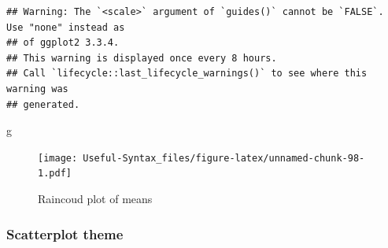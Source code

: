 \documentclass[
]{article}
\newenvironment{Shaded}{\begin{snugshade}}{\end{snugshade}}
\newcommand{\NormalTok}[1]{#1}
\begin{document}
\begin{verbatim}
## Warning: The `<scale>` argument of `guides()` cannot be `FALSE`. Use "none" instead as
## of ggplot2 3.3.4.
## This warning is displayed once every 8 hours.
## Call `lifecycle::last_lifecycle_warnings()` to see where this warning was
## generated.
\end{verbatim}

\begin{Shaded}
\begin{Highlighting}[]
\NormalTok{g}
\end{Highlighting}
\end{Shaded}

\begin{figure}
\centering
\texttt{[image: Useful-Syntax\_files/figure-latex/unnamed-chunk-98-1.pdf]}
\caption{\label{fig:unnamed-chunk-98}Raincoud plot of means}
\end{figure}

\hypertarget{scatterplot-theme}{%
\subsubsection{Scatterplot theme}\label{scatterplot-theme}}
\end{document}
